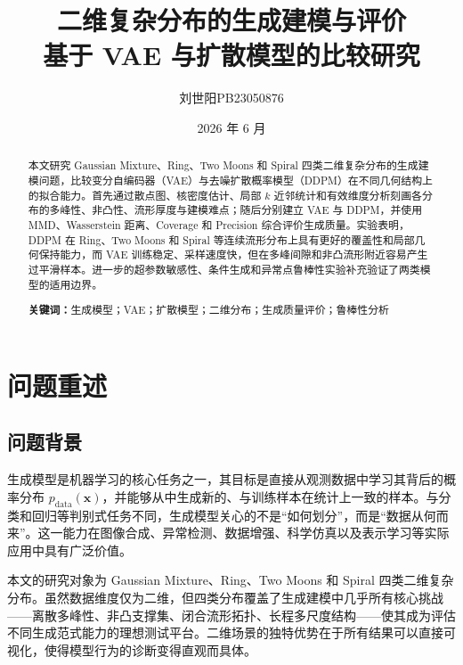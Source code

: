 \documentclass[10pt, a4paper, oneside]{ctexart}
\title{\textbf{二维复杂分布的生成建模与评价}\\[0.6em]\large 基于 VAE 与扩散模型的比较研究}
\author{刘世阳\quad PB23050876}
\date{2026 年 6 月}
\numberwithin{equation}{section}
\numberwithin{table}{section}
\numberwithin{figure}{section}
\newcommand{\vect}[1]{\mathbf{#1}}
\begin{document}
\maketitle
\setcounter{page}{0}
\thispagestyle{empty}

\begin{abstract}
{\fontsize{10}{15}\selectfont
本文研究 Gaussian Mixture、Ring、Two Moons 和 Spiral 四类二维复杂分布的生成建模问题，比较变分自编码器（VAE）与去噪扩散概率模型（DDPM）在不同几何结构上的拟合能力。首先通过散点图、核密度估计、局部 $k$ 近邻统计和有效维度分析刻画各分布的多峰性、非凸性、流形厚度与建模难点；随后分别建立 VAE 与 DDPM，并使用 MMD、Wasserstein 距离、Coverage 和 Precision 综合评价生成质量。实验表明，DDPM 在 Ring、Two Moons 和 Spiral 等连续流形分布上具有更好的覆盖性和局部几何保持能力，而 VAE 训练稳定、采样速度快，但在多峰间隙和非凸流形附近容易产生过平滑样本。进一步的超参数敏感性、条件生成和异常点鲁棒性实验补充验证了两类模型的适用边界。
\par\textbf{关键词：}生成模型；VAE；扩散模型；二维分布；生成质量评价；鲁棒性分析
}
\end{abstract}

\pagestyle{fancy}
\fancyhf{}
\fancyheadoffset{0cm}
\renewcommand{\headrulewidth}{0pt}
\renewcommand{\footrulewidth}{0pt}
\fancyfoot[C]{\thepage}

\newpage
{}
\setcounter{page}{1}
\tableofcontents
\newpage
{}
\setcounter{page}{1}

\section{问题重述}

\subsection{问题背景}

生成模型是机器学习的核心任务之一，其目标是直接从观测数据中学习其背后的概率分布 $p_{\mathrm{data}}(\vect{x})$，并能够从中生成新的、与训练样本在统计上一致的样本。与分类和回归等判别式任务不同，生成模型关心的不是“如何划分”，而是“数据从何而来”。这一能力在图像合成、异常检测、数据增强、科学仿真以及表示学习等实际应用中具有广泛价值。

本文的研究对象为 Gaussian Mixture、Ring、Two Moons 和 Spiral 四类二维复杂分布。虽然数据维度仅为二维，但四类分布覆盖了生成建模中几乎所有核心挑战——离散多峰性、非凸支撑集、闭合流形拓扑、长程多尺度结构——使其成为评估不同生成范式能力的理想测试平台。二维场景的独特优势在于所有结果可以直接可视化，使得模型行为的诊断变得直观而具体。
\end{document}
